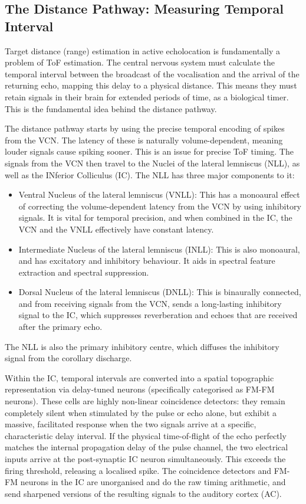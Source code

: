 \subsection{The Distance Pathway: Measuring Temporal Interval}
\label{sec:distance_pathway}
Target distance (range) estimation in active echolocation is fundamentally a problem of ToF estimation. The central nervous system must calculate the temporal interval between the broadcast of the vocalisation and the arrival of the returning echo, mapping this delay to a physical distance. This means they must retain signals in their brain for extended periods of time, as a biological timer. This is the fundamental idea behind the distance pathway.

The distance pathway starts by using the precise temporal encoding of spikes from the VCN. The latency of these is naturally volume-dependent, meaning louder signals cause spiking sooner. This is an issue for precise ToF timing. The signals from the VCN then travel to the Nuclei of the lateral lemniscus (NLL), as well as the INferior Colliculus (IC). The NLL has three major components to it:
\begin{itemize}
    \item Ventral Nucleus of the lateral lemniscus (VNLL): This has a monoaural effect of correcting the volume-dependent latency from the VCN by using inhibitory signals. It is vital for temporal precision, and when combined in the IC, the VCN and the VNLL effectively have constant latency.
    \item Intermediate Nucleus of the lateral lemniscus (INLL): This is also monoaural, and has excitatory and inhibitory behaviour. It aids in spectral feature extraction and spectral suppression.
    \item Dorsal Nucleus of the lateral lemniscus (DNLL): This is binaurally connected, and from receiving signals from the VCN, sends a long-lasting inhibitory signal to the IC, which suppresses reverberation and echoes that are received after the primary echo.
\end{itemize}
The NLL is also the primary inhibitory centre, which diffuses the inhibitory signal from the corollary discharge.

Within the IC, temporal intervals are converted into a spatial topographic representation via delay-tuned neurons (specifically categorised as FM-FM neurons). These cells are highly non-linear coincidence detectors: they remain completely silent when stimulated by the pulse or echo alone, but exhibit a massive, facilitated response when the two signals arrive at a specific, characteristic delay interval. If the physical time-of-flight of the echo perfectly matches the internal propagation delay of the pulse channel, the two electrical inputs arrive at the post-synaptic IC neuron simultaneously. This exceeds the firing threshold, releasing a localised spike. The coincidence detectors and FM-FM neurons in the IC are unorganised and do the raw timing arithmetic, and send sharpened versions of the resulting signals to the auditory cortex (AC).

